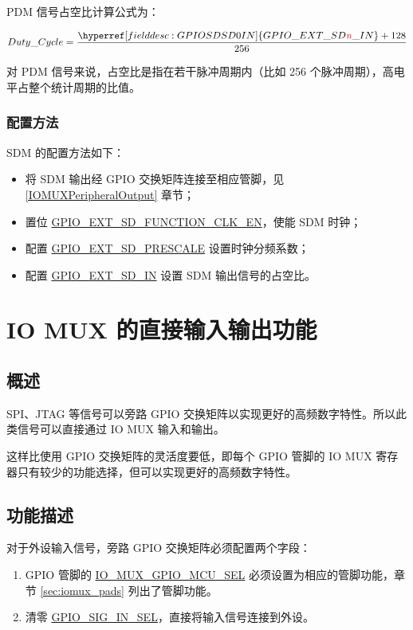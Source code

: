\documentclass[main\_\_CN.tex]{subfiles}
\begin{document}
PDM 信号占空比计算公式为：

    \[
    Duty\_Cycle=\frac{\hyperref[fielddesc:GPIOSDSD0IN]{GPIO\_EXT\_SD\regindex{n}\_IN} + 128} {256}
    \]
    
\begin{tiplisting}
对 PDM 信号来说，占空比是指在若干脉冲周期内（比如 256 个脉冲周期），高电平占整个统计周期的比值。
\end{tiplisting}

\subsubsection{配置方法}

SDM 的配置方法如下：

\begin{itemize}
    \item 将 SDM 输出经 GPIO 交换矩阵连接至相应管脚，见 \ref{IOMUXPeripheralOutput} 章节；
    \item 置位 \hyperref[fielddesc:GPIOSDFUNCTIONCLKEN]{GPIO\_EXT\_SD\_FUNCTION\_CLK\_EN}，使能 SDM 时钟；
    \item 配置 \hyperref[fielddesc:GPIOSDSD0PRESCALE]{GPIO\_EXT\_SD\_PRESCALE} 设置时钟分频系数；
    \item 配置 \hyperref[fielddesc:GPIOSDSD0IN]{GPIO\_EXT\_SD\_IN} 设置 SDM 输出信号的占空比。
\end{itemize}

\section{IO MUX 的直接输入输出功能}

\subsection{概述}

SPI、JTAG 等信号可以旁路 GPIO 交换矩阵以实现更好的高频数字特性。所以此类信号可以直接通过 IO MUX 输入和输出。

这样比使用 GPIO 交换矩阵的灵活度要低，即每个 GPIO 管脚的 IO MUX 寄存器只有较少的功能选择，但可以实现更好的高频数字特性。

\subsection{功能描述}

对于外设输入信号，旁路 GPIO 交换矩阵必须配置两个字段：

\begin{enumerate}
\item GPIO 管脚的 \hyperref[fielddesc:IOMUXGPIONMCUSEL]{IO\_MUX\_GPIO\_MCU\_SEL} 必须设置为相应的管脚功能，章节 \ref{sec:iomux_pads} 列出了管脚功能。
\item 清零 \hyperref[fielddesc:GPIOSIGNINSEL]{GPIO\_SIG\_IN\_SEL}，直接将输入信号连接到外设。
\end{enumerate}
\end{document}
